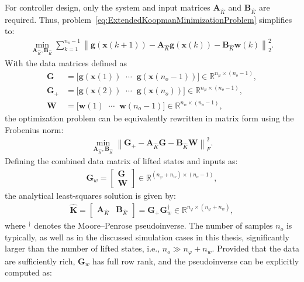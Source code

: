 For controller design, only the system and input matrices $\bm{A}_{\hat{K}}$ and $\bm{B}_{\hat{K}}$ are required. Thus, problem~\eqref{eq:ExtendedKoopmanMinimizationProblem} simplifies to:
\begin{align}
    \min_{\bm{A}_{\hat{K}}, \bm{B}_{\hat{K}}} 
    \sum_{k=1}^{n_o-1} 
    \left\| \bm{g}(\bm{x}(k+1)) - \bm{A}_{\hat{K}} \bm{g}(\bm{x}(k)) - \bm{B}_{\hat{K}} \bm{w}(k) \right\|_2^2.
    \label{eq:ApproxKoopman}
\end{align}
%
With the data matrices defined as
\begin{align}\label{eq:G_Gplus_datamatrices}
    \bm{G} &= \bigl[ \bm{g}(\bm{x}(1)) \;\; \cdots \;\; \bm{g}(\bm{x}(n_o-1)) \bigr] \in \mathbb{R}^{n_\varphi \times (n_o-1)}, \\
    \bm{G}_{+} &= \bigl[ \bm{g}(\bm{x}(2)) \;\; \cdots \;\; \bm{g}(\bm{x}(n_o)) \bigr] \in \mathbb{R}^{n_\varphi \times (n_o-1)}, \\
    \bm{W} &= \bigl[ \bm{w}(1) \;\; \cdots \;\; \bm{w}(n_o-1) \bigr] \in \mathbb{R}^{n_w \times (n_o-1)},
\end{align}
the optimization problem can be equivalently rewritten in matrix form using the Frobenius norm:
\begin{align}
    \min_{\bm{A}_{\hat{K}}, \bm{B}_{\hat{K}}} 
    \left\| \bm{G}_{+} - \bm{A}_{\hat{K}} \bm{G} - \bm{B}_{\hat{K}} \bm{W} \right\|_F^2.
\end{align}
Defining the combined data matrix of lifted states and inputs as:
\begin{align}
    \bm{G}_w = \begin{bmatrix} \bm{G} \\ \bm{W} \end{bmatrix} \in \mathbb{R}^{(n_\varphi + n_w)\times (n_o-1)},
\end{align}
the analytical least-squares solution is given by:
\begin{align}\label{eq:Koop_G_Gplus_datamatrices}
    \hat{\bm{K}} = \begin{bmatrix} \bm{A}_{\hat{K}} & \bm{B}_{\hat{K}} \end{bmatrix} 
    = \bm{G}_{+}  \bm{G}_w^{\dagger}
    \in \mathbb{R}^{n_\varphi \times (n_\varphi + n_w)},
\end{align}
where ${}^\dagger$ denotes the Moore–Penrose pseudoinverse. The number of samples $n_o$ is typically, as well as in the discussed simulation cases in this thesis, significantly larger than the number of lifted states, i.e., $n_o \gg n_\varphi + n_w$. Provided that the data are sufficiently rich, $\bm{G}_w$ has full row rank, and the pseudoinverse can be explicitly computed as:
